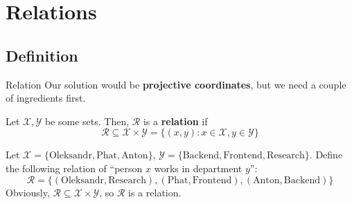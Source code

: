 \documentclass{zkdl-presentation-template}
\begin{document}
    \section{Relations}
    \subsection{Definition}
    \begin{frame}{Relation}
        Our solution would be \textbf{projective coordinates}, but we need a couple of ingredients first.

        \begin{definition}
            Let $\mathcal{X},\mathcal{Y}$ be some sets. Then, $\mathcal{R}$ is a \textbf{relation} if
            \begin{equation*}
                \mathcal{R} \subseteq \mathcal{X} \times \mathcal{Y} = \{(x,y): x \in \mathcal{X}, y \in \mathcal{Y}\}
            \end{equation*}
        \end{definition}

        \pause\begin{example}
            Let $\mathcal{X} = \{\text{Oleksandr}, \text{Phat}, \text{Anton}\}$, $\mathcal{Y} = \{\text{Backend}, \text{Frontend}, \text{Research}\}$. Define the following relation of ``person $x$ works in department $y$'':\pause
            \begin{equation*}
                \mathcal{R} = \{(\text{Oleksandr}, \text{Research}), (\text{Phat}, \text{Frontend}), (\text{Anton}, \text{Backend})\}
            \end{equation*}
            Obviously, $\mathcal{R} \subseteq \mathcal{X} \times \mathcal{Y}$, so $\mathcal{R}$ is a relation.
        \end{example}
    \end{frame}
\end{document}
